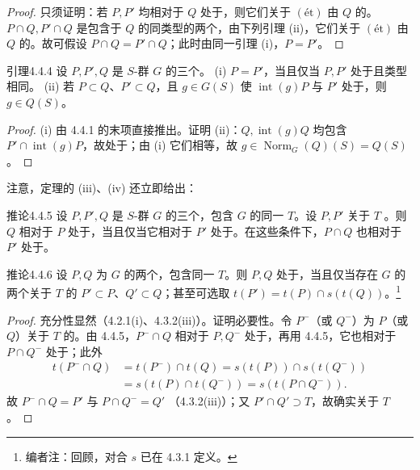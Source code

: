 \begin{proof}
只须证明：若 $P,P'$ 均相对于 $Q$ 处于，则它们关于 $(\text{ét})$ 由 $Q$ 的。$P\cap Q,P'\cap Q$ 是包含于 $Q$ 的同类型的两个，由下列引理 (ii)，它们关于 $(\text{ét})$ 由 $Q$ 的。故可假设 $P\cap Q=P'\cap Q$；此时由同一引理 (i)，$P=P'$。
\end{proof}
\begin{SGAresult}{引理}{4.4.4}
设 $P,P',Q$ 是 $S$-群 $G$ 的三个。
(i) $P=P'$，当且仅当 $P,P'$ 处于且类型相同。
(ii) 若 $P\subset Q$、$P'\subset Q$，且 $g\in G(S)$ 使 $\operatorname{int}(g)P$ 与 $P'$ 处于，则 $g\in Q(S)$。
\end{SGAresult}
\begin{proof}
(i) 由 4.4.1 的末项直接推出。证明 (ii)：$Q,\operatorname{int}(g)Q$ 均包含 $P'\cap\operatorname{int}(g)P$，故处于；由 (i) 它们相等，故 $g\in\operatorname{Norm}_G(Q)(S)=Q(S)$。
\end{proof}
注意，定理的 (iii)、(iv) 还立即给出：
\begin{SGAresult}{推论}{4.4.5}
设 $P,P',Q$ 是 $S$-群 $G$ 的三个，包含 $G$ 的同一 $T$。设 $P,P'$ 关于 $T$ 。则 $Q$ 相对于 $P$ 处于，当且仅当它相对于 $P'$ 处于。在这些条件下，$P\cap Q$ 也相对于 $P'$ 处于。
\end{SGAresult}
\begin{SGAresult}{推论}{4.4.6}
设 $P,Q$ 为 $G$ 的两个，包含同一 $T$。则 $P,Q$ 处于，当且仅当存在 $G$ 的两个关于 $T$ 的 $P'\subset P$、$Q'\subset Q$；甚至可选取 $t(P')=t(P)\cap s(t(Q))$。\footnote{编者注：回顾，对合 $s$ 已在 4.3.1 定义。}
\end{SGAresult}
\begin{proof}
充分性显然（4.2.1(i)、4.3.2(iii)）。证明必要性。令 $P^-$（或 $Q^-$）为 $P$（或 $Q$）关于 $T$ 的。由 4.4.5，$P^-\cap Q$ 相对于 $P,Q^-$ 处于，再用 4.4.5，它也相对于 $P\cap Q^-$ 处于；此外
\[\begin{aligned}
t(P^-\cap Q)&=t(P^-)\cap t(Q)=s(t(P))\cap s(t(Q^-))\\
&=s(t(P)\cap t(Q^-))=s(t(P\cap Q^-)).
\end{aligned}\]
故 $P^-\cap Q=P'$ 与 $P\cap Q^-=Q'$ （4.3.2(iii)）；又 $P'\cap Q'\supset T$，故确实关于 $T$ 。
\end{proof}
